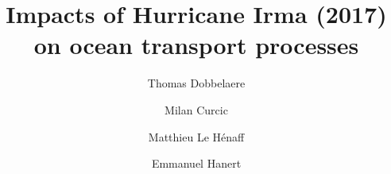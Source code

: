 \documentclass[preprint,12pt,authoryear]{elsarticle}
\begin{document}
\begin{frontmatter}



    \title{Impacts of Hurricane Irma (2017) on ocean transport processes}


    \author[eli]{Thomas Dobbelaere}
    \author[rsmas]{Milan Curcic}
    \author[cimas,aoml]{Matthieu Le H\'enaff}
    \author[eli,immc]{Emmanuel Hanert}


\end{frontmatter}
\end{document}
